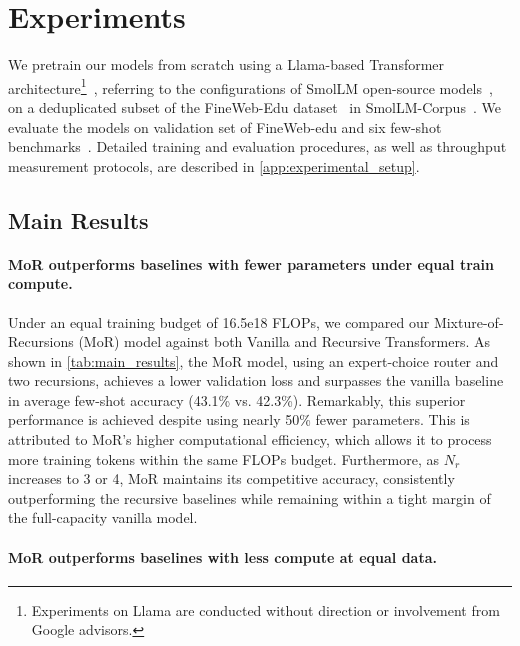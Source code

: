 \section{Experiments}


We pretrain our models from scratch using a Llama-based Transformer architecture\footnote{Experiments on Llama are conducted without direction or involvement from Google advisors.}~\citep{grattafiori2024llama}, referring to the configurations of SmolLM open-source models~\citep{allal2024SmolLM}, on a deduplicated subset of the FineWeb-Edu dataset~\citep{penedo2024the} in SmolLM-Corpus~\citep{benallal2024smollmcorpus}.
We evaluate the models on validation set of FineWeb-edu and six few-shot benchmarks~\citep{eval-harness}. Detailed training and evaluation procedures, as well as throughput measurement protocols, are described in \autoref{app:experimental_setup}.





\subsection{Main Results}
\label{subsec:main_results}


\paragraph{MoR outperforms baselines with fewer parameters under equal train compute.}
Under an equal training budget of 16.5e18 FLOPs, we compared our Mixture-of-Recursions (MoR) model against both Vanilla and Recursive Transformers. As shown in \autoref{tab:main_results}, the MoR model, using an expert-choice router and two recursions, achieves a lower validation loss and surpasses the vanilla baseline in average few-shot accuracy (43.1\% vs. 42.3\%). Remarkably, this superior performance is achieved despite using nearly 50\% fewer parameters. This is attributed to MoR's higher computational efficiency, which allows it to process more training tokens within the same FLOPs budget. Furthermore, as $N_r$ increases to 3 or 4, MoR maintains its competitive accuracy, consistently outperforming the recursive baselines while remaining within a tight margin of the full-capacity vanilla model.


\vspace{-10pt}
\paragraph{MoR outperforms baselines with less compute at equal data.}

